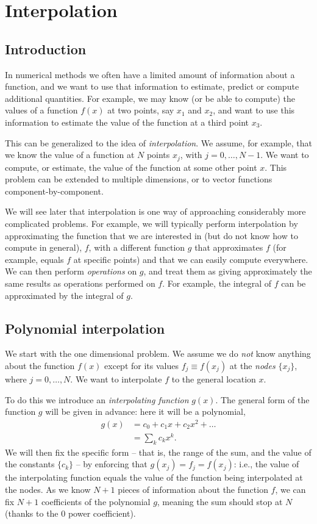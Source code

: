 \chapter{Interpolation}

\section{Introduction}

In numerical methods we often have a limited amount of information about a function, and we want to use that information to estimate, predict or compute additional quantities. For example, we may know (or be able to compute) the values of a function $f(x)$ at two points, say $x_1$ and $x_2$, and want to use this information to estimate the value of the function at a third point $x_3$.

This can be generalized to the idea of \emph{interpolation}. We assume, for example, that we know the value of a function at $N$ points $x_j$, with $j = 0, \dots, N-1$. We want to compute, or estimate, the value of the function at some other point $x$. This problem can be extended to multiple dimensions, or to vector functions component-by-component.

We will see later that interpolation is one way of approaching considerably more complicated problems. For example, we will typically perform interpolation by approximating the function that we are interested in (but do not know how to compute in general), $f$, with a different function $g$ that approximates $f$ (for example, equals $f$ at specific points) and that we can easily compute everywhere. We can then perform \emph{operations} on $g$, and treat them as giving approximately the same results as operations performed on $f$. For example, the integral of $f$ can be approximated by the integral of $g$.

\section{Polynomial interpolation}

We start with the one dimensional problem. We assume we do \emph{not} know anything about the function $f(x)$ except for its values $f_j \equiv f(x_j)$ at the \emph{nodes} $\{ x_j \}$, where $j = 0, \dots, N$. We want to interpolate $f$ to the general location $x$.

To do this we introduce an \emph{interpolating function} $g(x)$. The general form of the function $g$ will be given in advance: here it will be a polynomial,
%
\begin{align}
  g(x) &= c_0 + c_1 x + c_2 x^2 + \dots \\ &= \sum_k c_k x^k.
\end{align}
%
We will then fix the specific form -- that is, the range of the sum, and the value of the constants $\{ c_k \}$ -- by enforcing that $g(x_j) = f_j = f(x_j)$: i.e., the value of the interpolating function equals the value of the function being interpolated at the nodes. As we know $N+1$ pieces of information about the function $f$, we can fix $N+1$ coefficients of the polynomial $g$, meaning the sum should stop at $N$ (thanks to the $0$ power coefficient).

